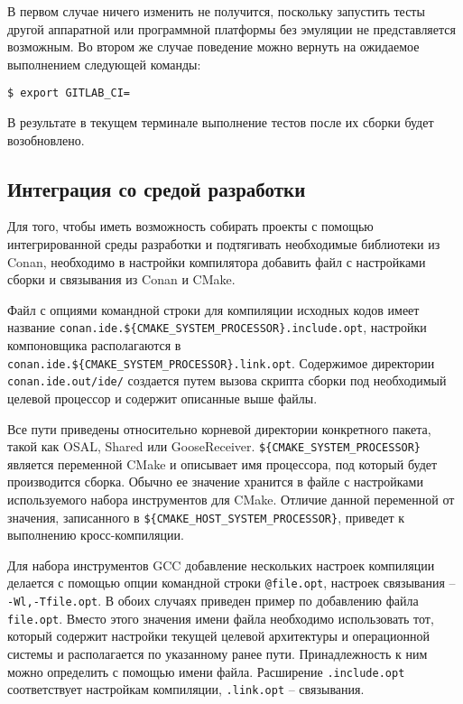 В первом случае ничего изменить не получится, поскольку запустить
тесты другой аппаратной или программной платформы без эмуляции не представляется
возможным.
Во втором же случае поведение можно вернуть на ожидаемое выполнением следующей
команды:

\begin{lstlisting}
$ export GITLAB_CI=
\end{lstlisting}

В результате в текущем терминале выполнение тестов после их сборки
будет возобновлено.

\subsection{Интеграция со средой разработки}

Для того, чтобы иметь возможность собирать проекты с помощью
интегрированной среды разработки и подтягивать необходимые
библиотеки из Conan, необходимо в настройки компилятора добавить
файл с настройками сборки и связывания из Conan и CMake.

Файл с опциями командной строки для компиляции исходных кодов имеет название
\lstinline!conan.ide.${CMAKE_SYSTEM_PROCESSOR}.include.opt!,
настройки компоновщика располагаются в
\lstinline!conan.ide.${CMAKE_SYSTEM_PROCESSOR}.link.opt!.
Содержимое директории \lstinline!conan.ide.out/ide/! создается путем вызова скрипта
сборки под необходимый целевой процессор и содержит описанные выше файлы.

Все пути приведены относительно корневой директории конкретного пакета, такой как
OSAL, Shared или GooseReceiver.
\lstinline!${CMAKE_SYSTEM_PROCESSOR}! является переменной CMake и
описывает имя процессора, под который будет производится сборка.
Обычно ее значение хранится в файле с настройками используемого набора инструментов
для CMake. Отличие данной переменной от значения, записанного в
\lstinline!${CMAKE_HOST_SYSTEM_PROCESSOR}!, приведет к выполнению
кросс-компиляции.

Для набора инструментов GCC добавление нескольких настроек компиляции делается с помощью
опции командной строки
\lstinline`@file.opt`, настроек связывания -- \lstinline`-Wl,-Tfile.opt`.
В обоих случаях приведен пример по добавлению файла \lstinline`file.opt`.
Вместо этого значения имени файла необходимо использовать тот,
который содержит настройки текущей целевой архитектуры и операционной
системы и располагается по указанному ранее пути. Принадлежность
к ним можно определить с помощью имени файла.
Расширение \lstinline{.include.opt} соответствует настройкам компиляции,
\lstinline{.link.opt} -- связывания.

